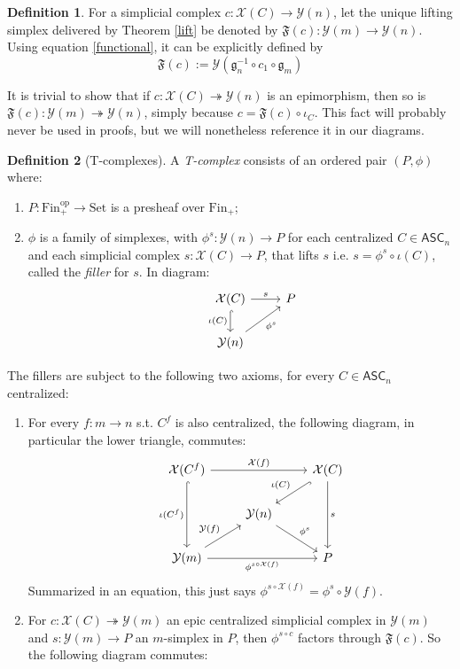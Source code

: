 \documentclass{article}
\theoremstyle{remark}
\theoremstyle{definition}
\newtheorem{definition}{Definition}[subsection]
\newcommand{\Fin}{\mathrm{Fin}}
\newcommand{\Set}{\mathrm{Set}}
\newcommand{\op}{\mathrm{op}}
\newcommand{\ASC}{\mathsf{ASC}}
\newcommand{\Y}{\mathcal Y}
\newcommand{\X}{\mathcal X}
\newcommand{\g}{\mathfrak g}
\newcommand{\F}{\mathfrak F}
\begin{document}
	\begin{definition}
		For a simplicial complex $c:\X(C)\to\Y(n)$, let the unique lifting simplex delivered by Theorem \ref{lift} be denoted by $\F(c):\Y(m)\to\Y(n)$. Using equation \ref{functional}, it can be explicitly defined by
		\[\F(c):=\Y(\g_n^{-1}\circ c_1\circ\g_m)\]
	\end{definition}
	It is trivial to show that if $c:\X(C)\twoheadrightarrow\Y(n)$ is an epimorphism, then so is $\F(c):\Y(m)\twoheadrightarrow\Y(n)$, simply because $c=\F(c)\circ\iota_C$. This fact will probably never be used in proofs, but we will nonetheless reference it in our diagrams.
	\begin{definition}[T-complexes]\label{Tcplx}
		A \textit{T-complex} consists of an ordered pair $(P,\phi)$ where:
		\begin{enumerate}
			\item $P:\Fin_+^\op\to\Set$ is a presheaf over $\Fin_+$;
			\item $\phi$ is a family of simplexes, with $\phi^s:\Y(n)\to P$ for each centralized $C\in\ASC_n$ and each simplicial complex $s:\X(C)\to P$, that lifts $s$ i.e. $s=\phi^s\circ\iota(C)$, called the \textit{filler} for $s$. In diagram:
			\[\begin{tikzcd}
				&\X(C)\arrow{r}{s}\arrow[hook]{d}[swap]{\iota(C)}&P\\
				&\Y(n)\arrow{ur}[swap]{\phi^s}
			\end{tikzcd}\]
		\end{enumerate}
		The fillers are subject to the following two axioms, for every $C\in\ASC_n$ centralized:
		\begin{enumerate}
			\item For every $f:m\to n$ s.t. $C^f$ is also centralized, the following diagram, in particular the lower triangle, commutes:
			\begin{equation}\label{pullbackcomp}\begin{tikzcd}
				&\X(C^f)\arrow[hook]{dd}[swap]{\iota(C^f)}\arrow{rr}{\X(f)}&&\X(C)\arrow[hook]{ld}[swap]{\iota(C)}\arrow{dd}{s}\\
				&&\Y(n)\arrow{dr}{\phi^s}\\
				&\Y(m)\arrow{ur}{\Y(f)}\arrow{rr}[swap]{\phi^{s\circ\X(f)}}&&P
			\end{tikzcd}\end{equation}
			Summarized in an equation, this just says $\phi^{s\circ\X(f)}=\phi^s\circ\Y(f)$.
			\item For $c:\X(C)\twoheadrightarrow\Y(m)$ an epic centralized simplicial complex in $\Y(m)$ and $s:\Y(m)\to P$ an $m$-simplex in $P$, then $\phi^{s\circ c}$ factors through $\F(c)$. So the following diagram commutes:

\end{enumerate}
\end{definition}
\end{document}
